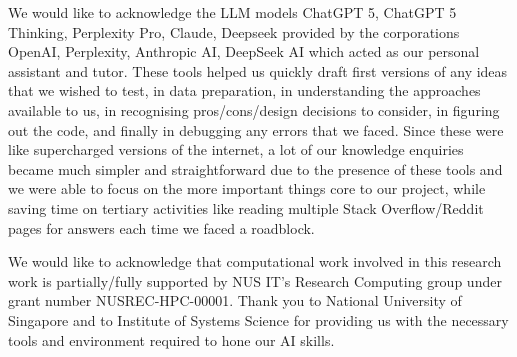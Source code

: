 \begin{acknowledgements}
We would like to acknowledge the LLM models ChatGPT 5, ChatGPT 5 Thinking, Perplexity Pro, Claude, Deepseek provided by the corporations OpenAI, Perplexity, Anthropic AI, DeepSeek AI which acted as our personal assistant and tutor. These tools helped us quickly draft first versions of any ideas that we wished to test, in data preparation, in understanding the approaches available to us, in recognising pros/cons/design decisions to consider, in figuring out the code, and finally in debugging any errors that we faced. Since these were like supercharged versions of the internet, a lot of our knowledge enquiries became much simpler and straightforward due to the presence of these tools and we were able to focus on the more important things core to our project, while saving time on tertiary activities like reading multiple Stack Overflow/Reddit pages for answers each time we faced a roadblock.

We would like to acknowledge that computational work involved in this
research work is partially/fully supported by NUS IT’s Research Computing
group under grant number NUSREC-HPC-00001. Thank you to National University of Singapore and to Institute of Systems Science for providing us with the necessary tools and environment required to hone our AI skills.
\end{acknowledgements}